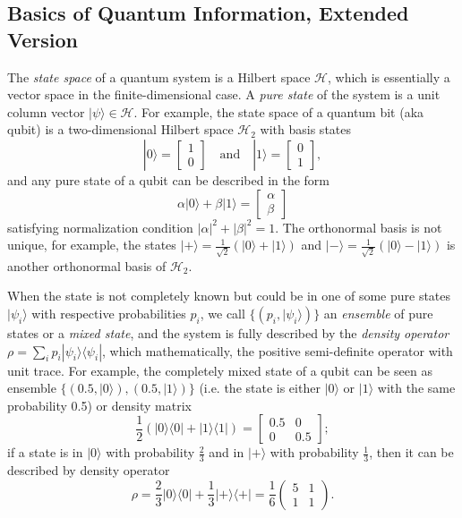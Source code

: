 \documentclass[conference,compsoc, 10pt]{IEEEtran}
\newcommand {\cH } {{\mathcal{H}}}
\def\>{\ensuremath{\rangle}}
\def\<{\ensuremath{\langle}}
\begin{document}
\begin{appendices}
		
		
		\subsection{Basics of Quantum Information, Extended Version}
		\label{sec basic Quantum extended version}
		
		The \emph{state space} of a quantum system is a Hilbert space $\cH$, which is
		essentially a vector space in the finite-dimensional case. A \emph{pure state}
		of the system is a unit column vector $|\psi\>\in\cH$. For example, the state
		space of a quantum bit (aka qubit) is a two-dimensional Hilbert space $\cH_2$ with
		basis states $$|0\> = \left[\begin{array}{c} 1 \\ 0\end{array} \right] \quad\text{and}\quad
		|1\> = \left[\begin{array}{c} 0 \\ 1 \end{array}\right],$$ and any pure state
		of a qubit can be described in the form $$\alpha|0\>+\beta|1\> =
		\left[\begin{array}{c} \alpha \\ \beta \end{array}\right]$$ satisfying
		normalization condition $|\alpha|^2+|\beta|^2 = 1$. The orthonormal basis is not unique, for example, the states $|+\> = \frac{1}{\sqrt{2}}(|0\>+|1\>)$ and $|-\> = \frac{1}{\sqrt{2}}(|0\>-|1\>)$ is another orthonormal basis of $\cH_2$.
		
		
		When the state is not
		completely known but could be in one of some pure states $|\psi_i\>$ with
		respective probabilities $p_i$, we call $\{(p_i,|\psi_i\>)\}$ an
		\emph{ensemble} of pure states or a \emph{mixed state}, and the system is
		fully described by the \emph{density operator} $\rho =
		\sum_ip_i|\psi_i\>\<\psi_i|$, which mathematically, the positive semi-definite operator with unit trace. For example, the completely mixed state of a
		qubit can be seen as ensemble $\{(0.5,|0\>), (0.5,|1\>)\}$ (i.e. the state is
		either $|0\>$ or $|1\>$ with the same probability 0.5) or density matrix
		$$\frac{1}{2}(|0\>\<0|+|1\>\<1|) = \left[\begin{array}{cc} 0.5 & 0 \\ 0 & 0.5
		\end{array}\right];$$ 
		if a state is in $|0\rangle$ with probability $\frac{2}{3}$ and in $|+\rangle$ with probability $\frac{1}{3}$, then it can be described by density operator
		\begin{equation}\label{ex-mix}\rho=\frac{2}{3}|0\rangle\langle 0|+\frac{1}{3}|+\rangle\langle +|=\frac{1}{6}\left (\begin{array}{cc}5 & 1\\ 1&1\end{array}\right ).\end{equation}
		

\end{appendices}
\end{document}
